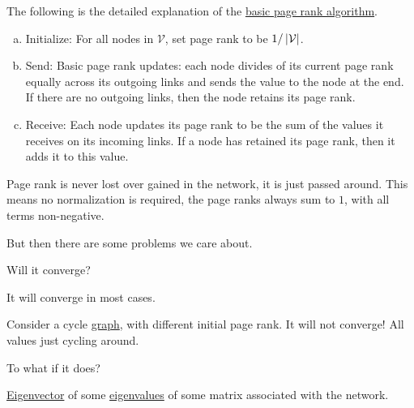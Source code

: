 \begin{remark}
	The following is the detailed explanation of the \hyperref[algo:basic-page-rank-algorithm]{basic page rank algorithm}.
	\begin{enumerate}[(a)]
		\item\label{algo:basic-page-rank-algorithm:initialize}
		Initialize: For all nodes in \(\mathcal{V}\), set page rank to be \(1 / \left\vert \mathcal{\MakeUppercase{v}}  \right\vert\).
		\item\label{algo:basic-page-rank-algorithm:send}
		Send: Basic page rank updates: each node divides of its current page rank equally across its outgoing
		links and sends the value to the node at the end. If there are no outgoing links, then the node retains its page rank.
		\item \label{algo:basic-page-rank-algorithm:receive}
		      Receive: Each node updates its page rank to be the sum of the values it receives on its incoming links. If
		      a node has retained its page rank, then it adds it to this value.
	\end{enumerate}
\end{remark}

\begin{note}
	Page rank is never lost over gained in the network, it is just passed around. This means no normalization is required,
	the page ranks always sum to \(1\), with all terms non-negative.
\end{note}

But then there are some problems we care about.
\begin{problem}
Will it converge?
\end{problem}
\begin{answer}
	It will converge in most cases.
\end{answer}

\begin{eg}
	Consider a cycle \hyperref[def:graph]{graph}, with different initial page rank. It will not converge! All values just cycling around.
\end{eg}

\begin{problem}
To what if it does?
\end{problem}
\begin{answer}
	\hyperref[def:eigenvector]{Eigenvector} of some \hyperref[def:eigenvalue]{eigenvalues} of some matrix associated with the network.
\end{answer}

